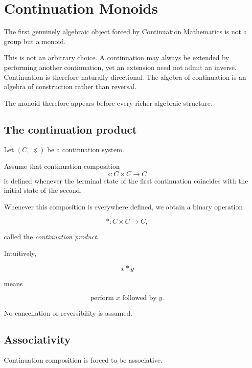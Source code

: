 \documentclass[13pt,openany]{book}
\theoremstyle{plain}
\theoremstyle{definition}
\begin{document}
\chapter{Continuation Monoids}

The first genuinely algebraic object forced by Continuation Mathematics is not
a group but a monoid.

This is not an arbitrary choice. A continuation may always be extended by
performing another continuation, yet an extension need not admit an inverse.
Continuation is therefore naturally directional. The algebra of continuation is
an algebra of construction rather than reversal.

The monoid therefore appears before every richer algebraic structure.

\section{The continuation product}

Let $(C,\preceq)$ be a continuation system.

Assume that continuation composition
\[
\circ:C\times C\longrightarrow C
\]
is defined whenever the terminal state of the first continuation coincides with
the initial state of the second.

Whenever this composition is everywhere defined, we obtain a binary operation

\[
*:C\times C\rightarrow C,
\]

called the \emph{continuation product}.

Intuitively,

\[
x*y
\]

means

\[
\text{perform }x\text{ followed by }y.
\]

No cancellation or reversibility is assumed.

\section{Associativity}

Continuation composition is forced to be associative.
\end{document}
